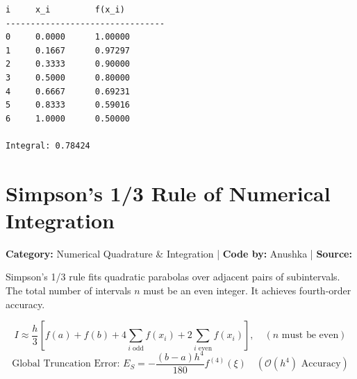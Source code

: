\documentclass[10pt,a4paper]{report}
\begin{document}
\begin{tcolorbox}[colback=termbg,colframe=primary,title=\textbf{Program Execution Output \& Convergence Table},boxrule=1pt,arc=2mm]
\begin{lstlisting}[style=terminal_output]
i     x_i         f(x_i)        
--------------------------------
0     0.0000      1.00000       
1     0.1667      0.97297       
2     0.3333      0.90000       
3     0.5000      0.80000       
4     0.6667      0.69231       
5     0.8333      0.59016       
6     1.0000      0.50000       

Integral: 0.78424
\end{lstlisting}
\end{tcolorbox}

\newpage

\section{Simpson's 1/3 Rule of Numerical Integration}
\textbf{Category:} \textcolor{secondary}{Numerical Quadrature \& Integration} \quad | \quad \textbf{Code by:} \textcolor{secondary}{Anushka} \quad | \quad \textbf{Source:} \texttt{}

Simpson's 1/3 rule fits quadratic parabolas over adjacent pairs of subintervals. The total number of intervals $n$ must be an even integer. It achieves fourth-order accuracy.

\begin{tcolorbox}[colback=theorybg,colframe=theoryframe,title=\textbf{Mathematical Theory \& Formulation},boxrule=1pt,arc=2mm]
\[
I \approx \frac{h}{3}\left[f(a) + f(b) + 4 \sum_{i \text{ odd}} f(x_i) + 2 \sum_{i \text{ even}} f(x_i)\right], \quad (n \text{ must be even})
\]
\[
\text{Global Truncation Error: } E_S = -\frac{(b - a) h^4}{180} f^{(4)}(\xi) \quad (\mathcal{O}(h^4) \text{ Accuracy})
\]
\end{tcolorbox}
\end{document}
